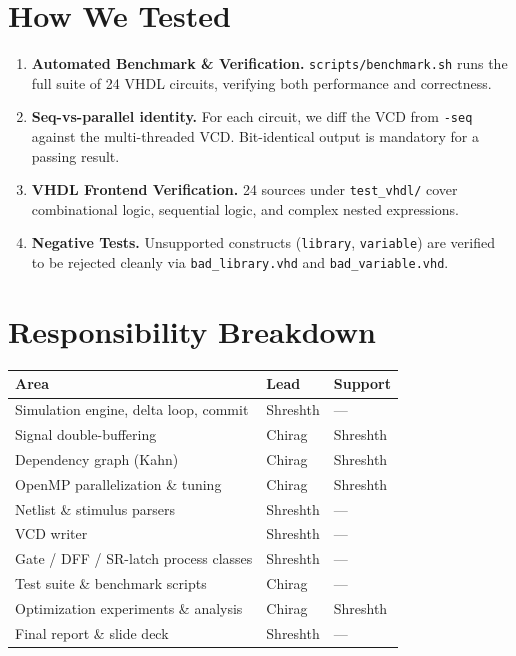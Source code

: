 \documentclass[9pt,a4paper]{article}
\begin{document}
\section{How We Tested}

\begin{enumerate}[leftmargin=1.5em,itemsep=2pt]
  \item \textbf{Automated Benchmark \& Verification.} \texttt{scripts/benchmark.sh} runs the full suite of 24 VHDL circuits, verifying both performance and correctness.
  \item \textbf{Seq-vs-parallel identity.} For each circuit, we diff the VCD from \texttt{-seq} against the multi-threaded VCD. Bit-identical output is mandatory for a passing result.
  \item \textbf{VHDL Frontend Verification.} 24 sources under \texttt{test\_vhdl/} cover combinational logic, sequential logic, and complex nested expressions.
  \item \textbf{Negative Tests.} Unsupported constructs (\texttt{library}, \texttt{variable}) are verified to be rejected cleanly via \texttt{bad\_library.vhd} and \texttt{bad\_variable.vhd}.
\end{enumerate}

\section{Responsibility Breakdown}

\begin{center}\small
\begin{tabular}{@{}p{6cm}p{3.5cm}p{3.5cm}@{}}
\toprule
Area & Lead & Support \\
\midrule
Simulation engine, delta loop, commit     & Shreshth       & — \\
Signal double-buffering                   & Chirag         & Shreshth \\
Dependency graph (Kahn)                   & Chirag         & Shreshth \\
OpenMP parallelization \& tuning          & Chirag         & Shreshth \\
Netlist \& stimulus parsers               & Shreshth       & — \\
VCD writer                                & Shreshth       & — \\
Gate / DFF / SR-latch process classes     & Shreshth       & — \\
Test suite \& benchmark scripts           & Chirag         & — \\
Optimization experiments \& analysis      & Chirag         & Shreshth \\
Final report \& slide deck                & Shreshth       & — \\
\bottomrule
\end{tabular}
\end{center}
\end{document}
